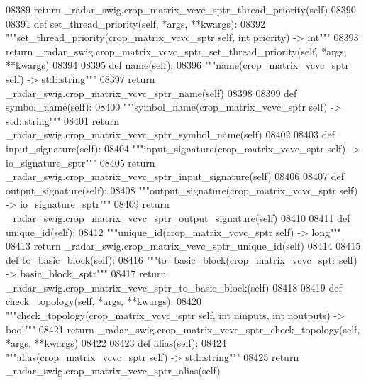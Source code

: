 \begin{DoxyCode}
{{{{{{{{{{{{{{{{{{{{{{{{{{{08389         \textcolor{keywordflow}{return} \_radar\_swig.crop\_matrix\_vcvc\_sptr\_thread\_priority(self)
08390 
08391     \textcolor{keyword}{def }set_thread_priority(self, *args, **kwargs):
08392         \textcolor{stringliteral}{"""set\_thread\_priority(crop\_matrix\_vcvc\_sptr self, int priority) -> int"""}
08393         \textcolor{keywordflow}{return} \_radar\_swig.crop\_matrix\_vcvc\_sptr\_set\_thread\_priority(self, *args, **kwargs)
08394 
08395     \textcolor{keyword}{def }name(self):
08396         \textcolor{stringliteral}{"""name(crop\_matrix\_vcvc\_sptr self) -> std::string"""}
08397         \textcolor{keywordflow}{return} \_radar\_swig.crop\_matrix\_vcvc\_sptr\_name(self)
08398 
08399     \textcolor{keyword}{def }symbol_name(self):
08400         \textcolor{stringliteral}{"""symbol\_name(crop\_matrix\_vcvc\_sptr self) -> std::string"""}
08401         \textcolor{keywordflow}{return} \_radar\_swig.crop\_matrix\_vcvc\_sptr\_symbol\_name(self)
08402 
08403     \textcolor{keyword}{def }input_signature(self):
08404         \textcolor{stringliteral}{"""input\_signature(crop\_matrix\_vcvc\_sptr self) -> io\_signature\_sptr"""}
08405         \textcolor{keywordflow}{return} \_radar\_swig.crop\_matrix\_vcvc\_sptr\_input\_signature(self)
08406 
08407     \textcolor{keyword}{def }output_signature(self):
08408         \textcolor{stringliteral}{"""output\_signature(crop\_matrix\_vcvc\_sptr self) -> io\_signature\_sptr"""}
08409         \textcolor{keywordflow}{return} \_radar\_swig.crop\_matrix\_vcvc\_sptr\_output\_signature(self)
08410 
08411     \textcolor{keyword}{def }unique_id(self):
08412         \textcolor{stringliteral}{"""unique\_id(crop\_matrix\_vcvc\_sptr self) -> long"""}
08413         \textcolor{keywordflow}{return} \_radar\_swig.crop\_matrix\_vcvc\_sptr\_unique\_id(self)
08414 
08415     \textcolor{keyword}{def }to_basic_block(self):
08416         \textcolor{stringliteral}{"""to\_basic\_block(crop\_matrix\_vcvc\_sptr self) -> basic\_block\_sptr"""}
08417         \textcolor{keywordflow}{return} \_radar\_swig.crop\_matrix\_vcvc\_sptr\_to\_basic\_block(self)
08418 
08419     \textcolor{keyword}{def }check_topology(self, *args, **kwargs):
08420         \textcolor{stringliteral}{"""check\_topology(crop\_matrix\_vcvc\_sptr self, int ninputs, int noutputs) -> bool"""}
08421         \textcolor{keywordflow}{return} \_radar\_swig.crop\_matrix\_vcvc\_sptr\_check\_topology(self, *args, **kwargs)
08422 
08423     \textcolor{keyword}{def }alias(self):
08424         \textcolor{stringliteral}{"""alias(crop\_matrix\_vcvc\_sptr self) -> std::string"""}
08425         \textcolor{keywordflow}{return} \_radar\_swig.crop\_matrix\_vcvc\_sptr\_alias(self)
}}}}}}}}}}}}}}}}}}}}}}}}}}}
\end{DoxyCode}

